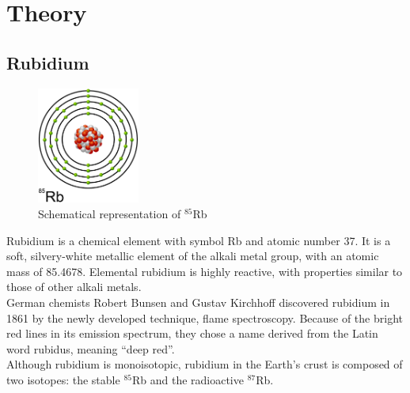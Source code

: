 
\chapter{Theory}  %
\pagebreak

\ifpdf{}
    \graphicspath{{Chapter1/Figs/Raster/}{Chapter1/Figs/PDF/}{Chapter1/Figs/}}
\else
    \graphicspath{{Chapter1/Figs/Vector/}{Chapter1/Figs/}}
\fi


\section{Rubidium} %

\begin{figure}[h]
\centering
\includegraphics[width=0.3\textwidth]{rubidium_atom}
\caption[Rubidium Atom]{Schematical representation of \(^{85}\)Rb}
\label{fig:Atom}
\end{figure}

Rubidium is a chemical element with symbol Rb and atomic number 37.
It is a soft, silvery-white metallic element of the alkali metal group, 
with an atomic mass of 85.4678. Elemental rubidium is highly reactive, with 
properties similar to those of other alkali metals.\\


German chemists Robert Bunsen and Gustav Kirchhoff discovered rubidium in 
1861 by the newly developed technique, flame spectroscopy.
Because of the bright red lines in its emission spectrum, they chose a name 
derived from the Latin word rubidus, meaning ``deep red''. \citep{bunsen}\\

Although rubidium is monoisotopic, rubidium in the Earth's crust is composed of 
two isotopes: the stable \(^{85}\)Rb and the radioactive \(^{87}\)Rb. \citep{nubase}

